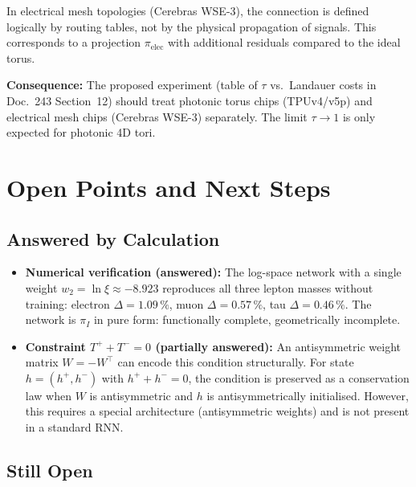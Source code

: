 In electrical mesh topologies (Cerebras WSE-3), the connection is defined
logically by routing tables, not by the physical propagation of signals.
This corresponds to a projection $\pi_\text{elec}$ with additional
residuals compared to the ideal torus.

\textbf{Consequence:} The proposed experiment (table of $\tau$
vs.\ Landauer costs in Doc.~243 Section~12) should treat photonic
torus chips (TPUv4/v5p) and electrical mesh chips (Cerebras WSE-3)
separately. The limit $\tau \to 1$ is only expected for photonic 4D tori.


\section{Open Points and Next Steps}

\subsection*{Answered by Calculation}

\begin{itemize}
  \item \textbf{Numerical verification (answered):}
        The log-space network with a single weight $w_2 = \ln\xi \approx -8.923$
        reproduces all three lepton masses without training:
        electron $\Delta=1.09\,\%$, muon $\Delta=0.57\,\%$, tau $\Delta=0.46\,\%$.
        The network is $\pi_I$ in pure form: functionally complete, geometrically incomplete.

  \item \textbf{Constraint $T^+ + T^- = 0$ (partially answered):}
        An antisymmetric weight matrix $W = -W^\top$ can encode this condition
        structurally. For state $h = (h^+, h^-)$ with $h^+ + h^- = 0$,
        the condition is preserved as a conservation law when $W$ is antisymmetric
        and $h$ is antisymmetrically initialised. However, this requires a special
        architecture (antisymmetric weights) and is not present in a standard RNN.
\end{itemize}

\subsection*{Still Open}

